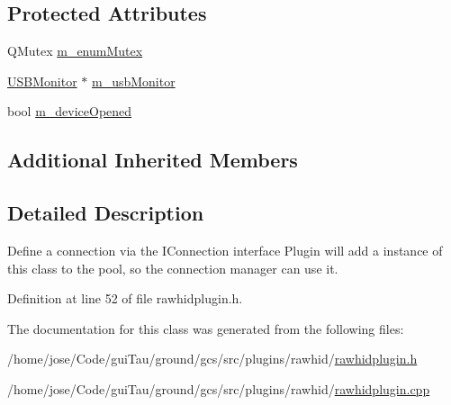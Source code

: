 \subsection*{Protected Attributes}
\begin{DoxyCompactItemize}
\item 
Q\-Mutex \hyperlink{group___raw_h_i_d_plugin_ga13d9bdfab2ab9e3a4f4cd08b53a2f105}{m\-\_\-enum\-Mutex}
\item 
\hyperlink{class_u_s_b_monitor}{U\-S\-B\-Monitor} $\ast$ \hyperlink{group___raw_h_i_d_plugin_ga03aaa7c95bd19c0d373b3c2b4e982cdb}{m\-\_\-usb\-Monitor}
\item 
bool \hyperlink{group___raw_h_i_d_plugin_ga043f346d34d71eb80f1e33ab78a82286}{m\-\_\-device\-Opened}
\end{DoxyCompactItemize}
\subsection*{Additional Inherited Members}


\subsection{Detailed Description}
Define a connection via the I\-Connection interface Plugin will add a instance of this class to the pool, so the connection manager can use it. 

Definition at line 52 of file rawhidplugin.\-h.



The documentation for this class was generated from the following files\-:\begin{DoxyCompactItemize}
\item 
/home/jose/\-Code/gui\-Tau/ground/gcs/src/plugins/rawhid/\hyperlink{rawhidplugin_8h}{rawhidplugin.\-h}\item 
/home/jose/\-Code/gui\-Tau/ground/gcs/src/plugins/rawhid/\hyperlink{rawhidplugin_8cpp}{rawhidplugin.\-cpp}\end{DoxyCompactItemize}

